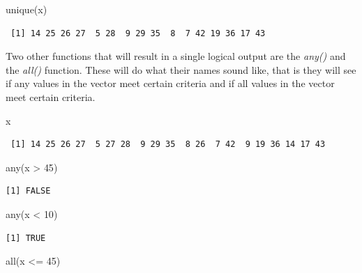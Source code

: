 \documentclass[
  letterpaper,
  DIV=11,
  numbers=noendperiod]{scrreprt}
\newenvironment{Shaded}{\begin{snugshade}}{\end{snugshade}}
\newcommand{\DecValTok}[1]{\textcolor[rgb]{0.68,0.00,0.00}{#1}}
\newcommand{\FunctionTok}[1]{\textcolor[rgb]{0.28,0.35,0.67}{#1}}
\newcommand{\NormalTok}[1]{\textcolor[rgb]{0.00,0.23,0.31}{#1}}
\newcommand{\SpecialCharTok}[1]{\textcolor[rgb]{0.37,0.37,0.37}{#1}}
\begin{document}
\begin{Shaded}
\begin{Highlighting}[]
\FunctionTok{unique}\NormalTok{(x)}
\end{Highlighting}
\end{Shaded}

\begin{verbatim}
 [1] 14 25 26 27  5 28  9 29 35  8  7 42 19 36 17 43
\end{verbatim}

Two other functions that will result in a single logical output are the
\emph{any()} and the \emph{all()} function. These will do what their
names sound like, that is they will see if any values in the vector meet
certain criteria and if all values in the vector meet certain criteria.

\begin{Shaded}
\begin{Highlighting}[]
\NormalTok{x}
\end{Highlighting}
\end{Shaded}

\begin{verbatim}
 [1] 14 25 26 27  5 27 28  9 29 35  8 26  7 42  9 19 36 14 17 43
\end{verbatim}

\begin{Shaded}
\begin{Highlighting}[]
\FunctionTok{any}\NormalTok{(x }\SpecialCharTok{\textgreater{}} \DecValTok{45}\NormalTok{)}
\end{Highlighting}
\end{Shaded}

\begin{verbatim}
[1] FALSE
\end{verbatim}

\begin{Shaded}
\begin{Highlighting}[]
\FunctionTok{any}\NormalTok{(x }\SpecialCharTok{\textless{}} \DecValTok{10}\NormalTok{)}
\end{Highlighting}
\end{Shaded}

\begin{verbatim}
[1] TRUE
\end{verbatim}

\begin{Shaded}
\begin{Highlighting}[]
\FunctionTok{all}\NormalTok{(x }\SpecialCharTok{\textless{}=} \DecValTok{45}\NormalTok{)}
\end{Highlighting}
\end{Shaded}
\end{document}
